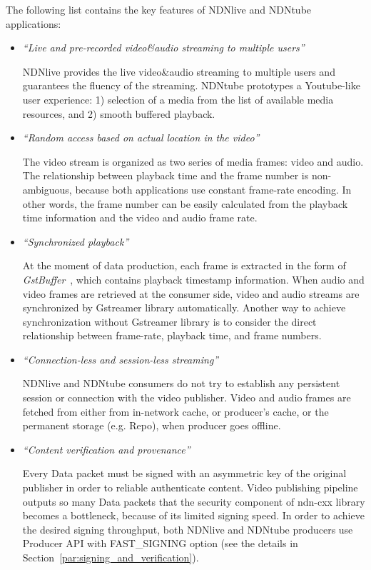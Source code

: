 The following list contains the key features of NDNlive and NDNtube applications:
\begin{itemize}
\item{\textit{``Live and pre-recorded video\&audio streaming to multiple users''}}

NDNlive provides the live video\&audio streaming to multiple users and guarantees the fluency of the streaming. NDNtube prototypes a Youtube-like user experience: 1) selection of a media from the list of available media resources, and 2) smooth buffered playback. 

\item{\textit{``Random access based on actual location in the video''}}

The video stream is organized as two series of media frames: video and audio. The relationship between playback time and the frame number is non-ambiguous, because both applications use constant frame-rate encoding. In other words, the frame number can be easily calculated from the playback time information and the video and audio frame rate. 

\item{\textit{``Synchronized playback''}}

At the moment of data production, each frame is extracted in the form of \textit{GstBuffer}~\cite{Gstbuffer}, which contains playback timestamp information. When audio and video frames are retrieved at the consumer side, video and audio streams are synchronized by Gstreamer library automatically. Another way to achieve synchronization without Gstreamer library is to consider the direct relationship between frame-rate, playback time, and frame numbers.

\item{\textit{``Connection-less and session-less streaming''}}

NDNlive and NDNtube consumers do not try to establish any persistent session or connection with the video publisher. Video and audio frames are fetched from either from in-network cache, or producer's cache, or the permanent storage (e.g. Repo), when producer goes offline.



\item{\textit{``Content verification and provenance''}}

Every Data packet must be signed with an asymmetric key of the original publisher in order to reliable authenticate content. Video publishing pipeline outputs so many Data packets that the security component of ndn-cxx library becomes a bottleneck, because of its limited signing speed. In order to achieve the desired signing throughput, both NDNlive and NDNtube producers use Producer API with FAST\_SIGNING option (see the details in Section~\ref{par:signing_and_verification}).

\end{itemize} 

